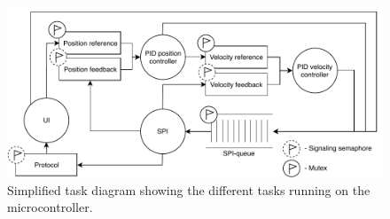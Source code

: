 \documentclass[../../main.tex]{subfiles}
\begin{document}

\begin{figure}[H]
    \centering
    \includegraphics[width=\textwidth]{Sections/System_Implementation/Images/OverviewTaskDiagramSimple.pdf}
    \caption{Simplified task diagram showing the different tasks running on the microcontroller.}
    \label{fig:OverviewTaskDiagramSimple}
\end{figure}
\end{document}
